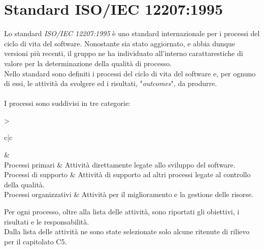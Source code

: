 \section{Standard ISO/IEC 12207:1995}
Lo standard \textit{ISO/IEC 12207:1995} è uno standard 
internazionale per i processi del ciclo di vita del software.
Nonostante sia stato aggiornato, e abbia dunque versioni più recenti, il gruppo
ne ha individuato all'interno carattarestiche di valore per la determinazione
della qualità di processo.\\
\noindent
Nello standard sono definiti i processi del ciclo di vita del 
software e, per ognuno di essi, le attività da svolgere ed i
risultati, "\textit{outcomes}", da produrre.\\ \\
\noindent 
I processi sono suddivisi in tre categorie:

\setlength\extrarowheight{5pt}

\begin{table}[h!]
	\footnotesize
    \centering
    \begin{tabular}{>{\raggedright\arraybackslash}c|c}
        &  \\[4pt]
	    	Processi primari & Attività direttamente legate allo sviluppo del software. \\[4pt]
	    	Processi di supporto & Attività di supporto ad altri processi legate al controllo della qualità. \\[4pt]
	    	Processi organizzativi & Attività per il miglioramento e la gestione delle risorse.\\[4pt]
    \end{tabular}
    \caption{Categorie di processo}
\end{table}

\noindent
Per ogni processo, oltre alla lista delle attività, sono riportati
gli obiettivi, i risultati e le responsabilità.\\
Dalla lista delle attività ne sono state selezionate solo alcune 
ritenute di rilievo per il capitolato C5.



\setlength\extrarowheight{0pt}

